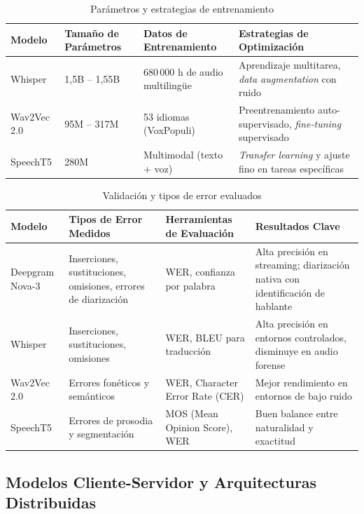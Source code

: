 \documentclass[12pt,a4paper,oneside]{report}
\begin{document}
\begin{table}[H]
\centering
\caption{Parámetros y estrategias de entrenamiento}
\begin{tabular}{|p{2.5cm}|p{3cm}|p{3.5cm}|p{3.5cm}|}
\hline
\rowcolor{gray!20}
\textbf{Modelo} & \textbf{Tamaño de Parámetros} & \textbf{Datos de Entrenamiento} & \textbf{Estrategias de Optimización} \\
\hline
Whisper & 1,5B -- 1,55B & 680\,000 h de audio multilingüe & Aprendizaje multitarea, \textit{data augmentation} con ruido \\
\hline
Wav2Vec 2.0 & 95M -- 317M & 53 idiomas (VoxPopuli) & Preentrenamiento auto-supervisado, \textit{fine-tuning} supervisado \\
\hline
SpeechT5 & 280M & Multimodal (texto + voz) & \textit{Transfer learning} y ajuste fino en tareas específicas \\
\hline
\end{tabular}
\label{tab:entrenamiento}
\end{table}

\begin{table}[H]
\centering
\caption{Validación y tipos de error evaluados}
\begin{tabular}{|p{2.5cm}|p{3cm}|p{3.5cm}|p{3.5cm}|}
\hline
\rowcolor{gray!20}
\textbf{Modelo} & \textbf{Tipos de Error Medidos} & \textbf{Herramientas de Evaluación} & \textbf{Resultados Clave} \\
\hline
Deepgram Nova-3 & Inserciones, sustituciones, omisiones, errores de diarización & WER, confianza por palabra & Alta precisión en streaming; diarización nativa con identificación de hablante \\
\hline
Whisper & Inserciones, sustituciones, omisiones & WER, BLEU para traducción & Alta precisión en entornos controlados, disminuye en audio forense \\
\hline
Wav2Vec 2.0 & Errores fonéticos y semánticos & WER, Character Error Rate (CER) & Mejor rendimiento en entornos de bajo ruido \\
\hline
SpeechT5 & Errores de prosodia y segmentación & MOS (Mean Opinion Score), WER & Buen balance entre naturalidad y exactitud \\
\hline
\end{tabular}
\label{tab:validacion}
\end{table}

\subsection{Modelos Cliente-Servidor y Arquitecturas Distribuidas}
\end{document}
